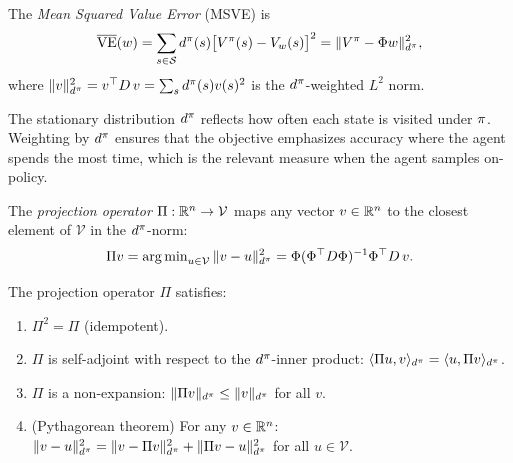\documentclass[11pt,a4paper]{article}
\begin{document}
\begin{definition}
\label{def:msve}
The \emph{Mean Squared Value Error} (MSVE) is
\begin{equation}
  \overline{\mathrm{VE}}(w)
  = \sum_{s \in \mathcal{S}} d^\pi(s)\bigl[V^\pi(s) - V_w(s)\bigr]^2
  = \|V^\pi - \Phi w\|_{d^\pi}^2,
  \label{eq:msve}
\end{equation}
where $\|v\|_{d^\pi}^2 = v^\top D\, v = \sum_s d^\pi(s) v(s)^2$
is the $d^\pi$-weighted $L^2$ norm.
\end{definition}

\begin{remark}
\label{rem:weighting}
The stationary distribution $d^\pi$ reflects how often each state
is visited under $\pi$. Weighting by $d^\pi$ ensures that the
objective emphasizes accuracy where the agent spends the most time,
which is the relevant measure when the agent samples on-policy.
\end{remark}

\begin{definition}
\label{def:projection}
The \emph{projection operator} $\Pi : \mathbb{R}^n \to \mathcal{V}$ maps any
vector $v \in \mathbb{R}^n$ to the closest element of $\mathcal{V}$ in the
$d^\pi$-norm:
\begin{equation}
  \Pi v = \operatorname{arg\,min}_{u \in \mathcal{V}} \|v - u\|_{d^\pi}^2
  = \Phi (\Phi^\top D \Phi)^{-1} \Phi^\top D\, v.
  \label{eq:projection}
\end{equation}
\end{definition}

\begin{proposition}[Properties of $\Pi$]
\label{prop:projection_properties}
The projection operator $\Pi$ satisfies:
\begin{enumerate}
  \item $\Pi^2 = \Pi$ (idempotent).
  \item $\Pi$ is self-adjoint with respect to the $d^\pi$-inner
    product: $\langle \Pi u, v \rangle_{d^\pi}
    = \langle u, \Pi v \rangle_{d^\pi}$.
  \item $\Pi$ is a non-expansion: $\|\Pi v\|_{d^\pi} \leq
    \|v\|_{d^\pi}$ for all $v$.
  \item (Pythagorean theorem) For any $v \in \mathbb{R}^n$:
    $\|v - u\|_{d^\pi}^2 = \|v - \Pi v\|_{d^\pi}^2
    + \|\Pi v - u\|_{d^\pi}^2$ for all $u \in \mathcal{V}$.
\end{enumerate}
\end{proposition}
\end{document}
